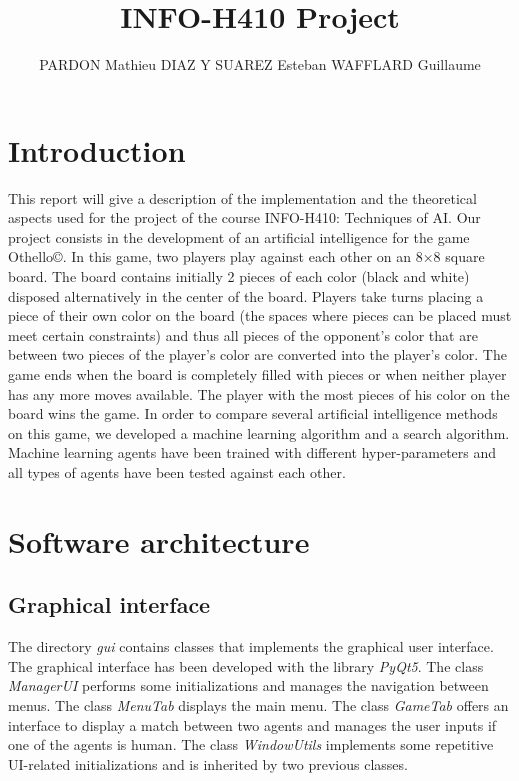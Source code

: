 \documentclass{article}
\title{INFO-H410 Project}
\author{PARDON Mathieu DIAZ Y SUAREZ Esteban WAFFLARD Guillaume}
\date{}
\begin{document}
\maketitle
\tableofcontents
\clearpage


\section{Introduction}

This report will give a description of the implementation and the theoretical aspects used for the project of the course INFO-H410: Techniques of AI. Our project consists in the development of an artificial intelligence for the game Othello\copyright. In this game, two players play against each other on an 8×8 square board. The board contains initially 2 pieces of each color (black and white) disposed alternatively in the center of the board. Players take turns placing a piece of their own color on the board (the spaces where pieces can be placed must meet certain constraints) and thus all pieces of the opponent's color that are between two pieces of the player's color are converted into the player's color. The game ends when the board is completely filled with pieces or when neither player has any more moves available. The player with the most pieces of his color on the board wins the game. In order to compare several artificial intelligence methods on this game, we developed a machine learning algorithm and a search algorithm. Machine learning agents have been trained with different hyper-parameters and all types of agents have been tested against each other.

\section{Software architecture}

\subsection{Graphical interface}

The directory \textit{gui} contains classes that implements the graphical user interface. The graphical interface has been developed with the library \textit{PyQt5}. The class \textit{ManagerUI} performs some initializations and manages the navigation between menus. The class \textit{MenuTab} displays the main menu. The class \textit{GameTab} offers an interface to display a match between two agents and manages the user inputs if one of the agents is human. The class \textit{WindowUtils} implements some repetitive UI-related initializations and is inherited by two previous classes.
\end{document}
